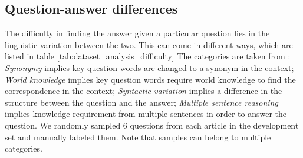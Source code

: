 \documentclass{article}
\begin{document}
\begin{table}[ht]
    \centering
    \caption{Question type by frequency for the development set of FQuAD1.1}
    \label{tab:dataset_analysis_question}
\end{table}

\subsection{Question-answer differences}

The difficulty in finding the answer given a particular question lies in the linguistic variation between the two. 
This can come in different ways, which are listed in table \ref{tab:dataset_analysis_difficulty}
The categories are taken from \citep{rajpurkar-etal-2016-squad}: \textit{Synonymy} implies key question words are changed to a synonym in the context; \textit{World knowledge} implies key question words require world knowledge to find the correspondence in the context; \textit{Syntactic variation} implies a difference in the structure between the question and the answer; \textit{Multiple sentence reasoning} implies knowledge requirement from multiple sentences in order to answer the question.
We randomly sampled 6 questions from each article in the development set and manually labeled them.
Note that samples can belong to multiple categories.
\end{document}
